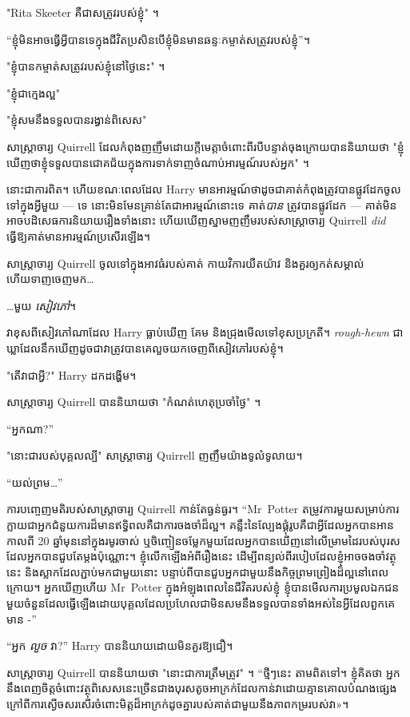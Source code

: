 {{{{"Rita Skeeter គឺជាសត្រូវរបស់ខ្ញុំ" ។

“ខ្ញុំ​មិន​អាច​ធ្វើ​អ្វី​បាន​ទេ​ក្នុង​ជីវិត​ប្រសិន​បើ​ខ្ញុំ​មិន​មាន​ឆន្ទៈ​កម្ចាត់​សត្រូវ​របស់​ខ្ញុំ”។

"ខ្ញុំបានកម្ចាត់សត្រូវរបស់ខ្ញុំនៅថ្ងៃនេះ" ។

"ខ្ញុំជាក្មេងល្អ"

"ខ្ញុំសមនឹងទទួលបានរង្វាន់ពិសេស"

សាស្រ្តាចារ្យ Quirrell ដែលកំពុងញញឹមដោយក្តីមេត្តាចំពោះពីរបីបន្ទាត់ចុងក្រោយបាននិយាយថា "ខ្ញុំឃើញថាខ្ញុំទទួលបានជោគជ័យក្នុងការទាក់ទាញចំណាប់អារម្មណ៍របស់អ្នក" ។

នោះជាការពិត។ ហើយខណៈពេលដែល Harry មានអារម្មណ៍ថាដូចជាគាត់កំពុងត្រូវបានផ្លូវដែកចូលទៅក្នុងអ្វីមួយ — ទេ នោះមិនមែនគ្រាន់តែជាអារម្មណ៍នោះទេ គាត់\emph{បាន} ត្រូវបានផ្លូវដែក — គាត់មិនអាចបដិសេធការនិយាយរឿងទាំងនោះ ហើយឃើញស្នាមញញឹមរបស់សាស្រ្តាចារ្យ Quirrell \emph{did} ធ្វើឱ្យគាត់មានអារម្មណ៍ប្រសើរឡើង។

សាស្ត្រាចារ្យ Quirrell ចូលទៅក្នុងអាវធំរបស់គាត់ កាយវិការយឺតយ៉ាវ និងគួរឲ្យកត់សម្គាល់ ហើយទាញចេញមក…

…មួយ \emph{សៀវភៅ}។

វាខុសពីសៀវភៅណាដែល Harry ធ្លាប់ឃើញ គែម និងជ្រុងមើលទៅខុសប្រក្រតី។ \emph{rough-hewn} ជា​ឃ្លា​ដែល​នឹក​ឃើញ​ដូច​ជា​វា​ត្រូវ​បាន​គេ​លួច​យក​ចេញ​ពី​សៀវភៅ​របស់ខ្ញុំ។

"តើវាជាអ្វី?" Harry ដកដង្ហើម។

សាស្រ្តាចារ្យ Quirrell បាននិយាយថា "កំណត់ហេតុប្រចាំថ្ងៃ" ។

“អ្នកណា?”

"នោះជារបស់បុគ្គលល្បី" សាស្រ្តាចារ្យ Quirrell ញញឹមយ៉ាងទូលំទូលាយ។

“យល់ព្រម…”

ការបញ្ចេញមតិរបស់សាស្រ្តាចារ្យ Quirrell កាន់តែធ្ងន់ធ្ងរ។ “Mr~Potter តម្រូវការមួយសម្រាប់ការក្លាយជាអ្នកជំនួយការដ៏មានឥទ្ធិពលគឺជាការចងចាំដ៏ល្អ។ គន្លឹះនៃល្បែងផ្គុំរូបគឺជាអ្វីដែលអ្នកបានអានកាលពី 20 ឆ្នាំមុននៅក្នុងរមូរចាស់ ឬចិញ្ចៀនចម្លែកមួយដែលអ្នកបានឃើញនៅលើម្រាមដៃរបស់បុរសដែលអ្នកបានជួបតែម្តងប៉ុណ្ណោះ។ ខ្ញុំលើកឡើងអំពីរឿងនេះ ដើម្បីពន្យល់ពីរបៀបដែលខ្ញុំអាចចងចាំវត្ថុនេះ និងស្លាកដែលភ្ជាប់មកជាមួយនោះ បន្ទាប់ពីបានជួបអ្នកជាមួយនឹងកិច្ចព្រមព្រៀងដ៏ល្អនៅពេលក្រោយ។ អ្នកឃើញហើយ Mr~Potter ក្នុងអំឡុងពេលនៃជីវិតរបស់ខ្ញុំ ខ្ញុំបានមើលការប្រមូលឯកជនមួយចំនួនដែលធ្វើឡើងដោយបុគ្គលដែលប្រហែលជាមិនសមនឹងទទួលបានទាំងអស់នៃអ្វីដែលពួកគេមាន -”

“អ្នក \emph{លួច} វា?” Harry បាននិយាយដោយមិនគួរឱ្យជឿ។

សាស្រ្តាចារ្យ Quirrell បាននិយាយថា "នោះជាការត្រឹមត្រូវ" ។ “ថ្មីៗនេះ តាមពិតទៅ។ ខ្ញុំ​គិត​ថា អ្នក​នឹង​ពេញចិត្ត​ចំពោះ​វត្ថុ​ពិសេស​នេះ​ច្រើន​ជាង​បុរស​តូច​អាក្រក់​ដែល​កាន់​វា​ដោយ​គ្មាន​គោលបំណង​ផ្សេង​ក្រៅ​ពី​ការ​ស្ងើច​សរសើរ​ចំពោះ​មិត្ត​ដ៏​អាក្រក់​ដូចគ្នា​របស់​គាត់​ជាមួយនឹង​ភាព​កម្រ​របស់​វា​»​។

}}}}
